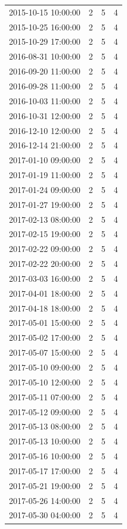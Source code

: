 \begin{tabular}{lrrr}
2015-10-15 10:00:00 & 2 & 5 & 4 \\
2015-10-25 16:00:00 & 2 & 5 & 4 \\
2015-10-29 17:00:00 & 2 & 5 & 4 \\
2016-08-31 10:00:00 & 2 & 5 & 4 \\
2016-09-20 11:00:00 & 2 & 5 & 4 \\
2016-09-28 11:00:00 & 2 & 5 & 4 \\
2016-10-03 11:00:00 & 2 & 5 & 4 \\
2016-10-31 12:00:00 & 2 & 5 & 4 \\
2016-12-10 12:00:00 & 2 & 5 & 4 \\
2016-12-14 21:00:00 & 2 & 5 & 4 \\
2017-01-10 09:00:00 & 2 & 5 & 4 \\
2017-01-19 11:00:00 & 2 & 5 & 4 \\
2017-01-24 09:00:00 & 2 & 5 & 4 \\
2017-01-27 19:00:00 & 2 & 5 & 4 \\
2017-02-13 08:00:00 & 2 & 5 & 4 \\
2017-02-15 19:00:00 & 2 & 5 & 4 \\
2017-02-22 09:00:00 & 2 & 5 & 4 \\
2017-02-22 20:00:00 & 2 & 5 & 4 \\
2017-03-03 16:00:00 & 2 & 5 & 4 \\
2017-04-01 18:00:00 & 2 & 5 & 4 \\
2017-04-18 18:00:00 & 2 & 5 & 4 \\
2017-05-01 15:00:00 & 2 & 5 & 4 \\
2017-05-02 17:00:00 & 2 & 5 & 4 \\
2017-05-07 15:00:00 & 2 & 5 & 4 \\
2017-05-10 09:00:00 & 2 & 5 & 4 \\
2017-05-10 12:00:00 & 2 & 5 & 4 \\
2017-05-11 07:00:00 & 2 & 5 & 4 \\
2017-05-12 09:00:00 & 2 & 5 & 4 \\
2017-05-13 08:00:00 & 2 & 5 & 4 \\
2017-05-13 10:00:00 & 2 & 5 & 4 \\
2017-05-16 10:00:00 & 2 & 5 & 4 \\
2017-05-17 17:00:00 & 2 & 5 & 4 \\
2017-05-21 19:00:00 & 2 & 5 & 4 \\
2017-05-26 14:00:00 & 2 & 5 & 4 \\
2017-05-30 04:00:00 & 2 & 5 & 4 \\

\end{tabular}

